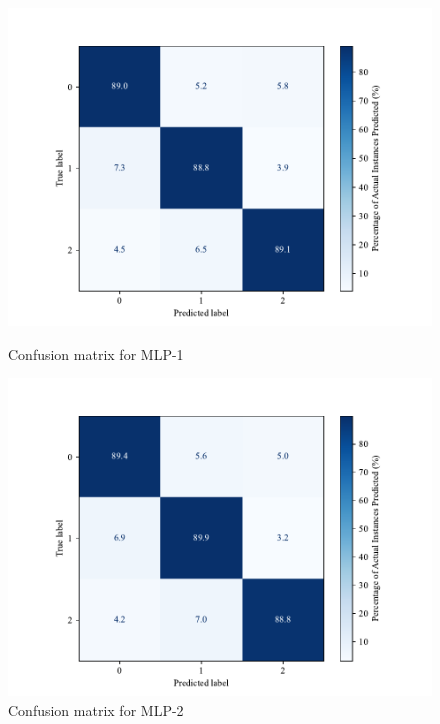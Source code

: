     \begin{figure}[H]
        \centering
        \begin{minipage}[b]{0.45\textwidth}
            \centering
            \includegraphics[width=\textwidth]{images/confusion_matrix_mlp200.pdf}
            \caption{Confusion matrix for MLP-1}
            \label{fig:confusion_mlp_1}
        \end{minipage}
        \hfill
        \begin{minipage}[b]{0.45\textwidth}
            \centering
            \includegraphics[width=\textwidth]{images/confusion_matrix_mlp100.pdf}
            \caption{Confusion matrix for MLP-2}
            \label{fig:confusion_mlp_2}
        \end{minipage}
    \end{figure}
    
